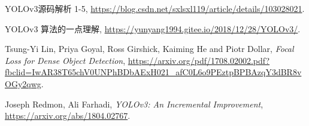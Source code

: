 \documentclass[10pt,a4paper]{article}
\begin{document}
\begin{thebibliography}{9}
    YOLOv3源码解析 1-5, \url{https://blog.csdn.net/sxlsxl119/article/details/103028021}.

    YOLOv3 算法的一点理解, \url{https://yunyang1994.gitee.io/2018/12/28/YOLOv3/}.

     Tsung-Yi Lin, Priya Goyal, Ross Girshick, Kaiming He and  Piotr Dollar, \textit{Focal Loss for Dense Object Detection}, \url{https://arxiv.org/pdf/1708.02002.pdf?fbclid=IwAR38T65chV0UNPhBDbAExH021_afC0L6o9PEztpBPBAzqY3dBR8vOGy2qwg}. 

     Joseph Redmon, Ali Farhadi, \textit{YOLOv3: An Incremental Improvement}, \url{https://arxiv.org/abs/1804.02767}.
\end{thebibliography}
\end{document}
